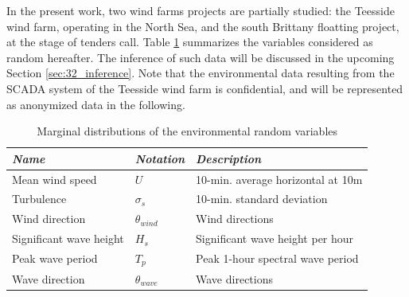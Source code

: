 In the present work, two wind farms projects are partially studied: the Teesside wind farm, operating in the North Sea, and the south Brittany floatting project, at the stage of tenders call. 
Table \ref{tab:envi_variables} summarizes the variables considered as random hereafter. 
The inference of such data will be discussed in the upcoming Section \ref{sec:32_inference}. 
Note that the environmental data resulting from the SCADA system of the Teesside wind farm is confidential, and will be represented as anonymized data in the following. 

\begin{table}[h!]
    \centering
    \begin{tabular}{ l l l}
        \hline
        {\it Name} & {\it Notation} & {\it Description}\\
        \hline
        Mean wind speed & $U$ & 10-min. average horizontal at 10m\\
        Turbulence & $\sigma_s $ & 10-min.  standard deviation \\
        Wind direction & $\theta_{wind} $ & Wind directions\\
        Significant wave height & $H_s $  & Significant wave height per hour\\
        Peak wave period & $T_p $ & Peak 1-hour spectral wave period \\
        Wave direction & $\theta_{wave} $ & Wave directions\\
        \hline
    \end{tabular}
    \caption{Marginal distributions of the environmental random variables}
    \label{tab:envi_variables}
\end{table}

